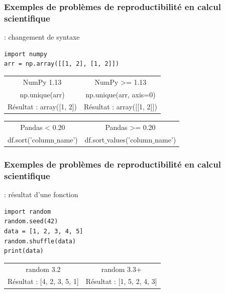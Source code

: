 \begin{frame}[fragile]
  \frametitle{Exemples de problèmes de reproductibilité en calcul scientifique}
   : changement de syntaxe \\
 \vspace{-0.2cm}  
 \begin{verbatim}
import numpy
arr = np.array([[1, 2], [1, 2]])   
\end{verbatim} 
 \begin{tabular}{|c|c|}
\hline
NumPy 1.13 & NumPy >= 1.13 \\
np.unique(arr) & np.unique(arr, axis=0) \\
Résultat : array([1, 2])  & Résultat : array([[1, 2]]) \\
\hline
 \end{tabular}


 \vspace{0.25cm} 


\begin{tabular}{|c|c|}
\hline
Pandas < 0.20 & Pandas >= 0.20 \\
df.sort('column$\_$name') &df.sort$\_$values('column$\_$name') \\
\hline
\end{tabular}
\end{frame}



\begin{frame}[fragile]
  \frametitle{Exemples de problèmes de reproductibilité en calcul scientifique}
   : résultat d'une fonction 
\vspace{0.15cm}
\begin{verbatim}
import random
random.seed(42)
data = [1, 2, 3, 4, 5]
random.shuffle(data)
print(data)
\end{verbatim}

\begin{tabular}{|c|c|}
\hline
random 3.2 & random 3.3+ \\
Résultat : [4, 2, 3, 5, 1] & Résultat : [1, 5, 2, 4, 3] \\
\hline
\end{tabular}
\end{frame}





